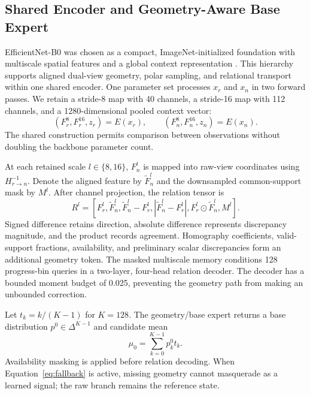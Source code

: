 \documentclass[electronics,article,submit,oneauthor]{Definitions/mdpi}
\begin{document}
\subsection{Shared Encoder and Geometry-Aware Base Expert}
\label{subsec:geometry}

EfficientNet-B0 was chosen as a compact, ImageNet-initialized foundation with multiscale spatial features and a global context representation \cite{tan2019efficientnet}. This hierarchy supports aligned dual-view geometry, polar sampling, and relational transport within one shared encoder. One parameter set processes $x_r$ and $x_n$ in two forward passes. We retain a stride-8 map with 40 channels, a stride-16 map with 112 channels, and a 1280-dimensional pooled context vector:
\begin{equation}
(F_r^8,F_r^{16},z_r)=E(x_r),\qquad (F_n^8,F_n^{16},z_n)=E(x_n).
\label{eq:encoder}
\end{equation}
The shared construction permits comparison between observations without doubling the backbone parameter count.

At each retained scale $l\in\{8,16\}$, $F_n^l$ is mapped into raw-view coordinates using $H_{r\rightarrow n}^{-1}$. Denote the aligned feature by $\widetilde{F}_n^l$ and the downsampled common-support mask by $M^l$. After channel projection, the relation tensor is
\begin{equation}
R^l=\left[F_r^l,\widetilde{F}_n^l,\widetilde{F}_n^l-F_r^l,
|\widetilde{F}_n^l-F_r^l|,F_r^l\odot\widetilde{F}_n^l,M^l\right].
\label{eq:relation}
\end{equation}
Signed difference retains direction, absolute difference represents discrepancy magnitude, and the product records agreement. Homography coefficients, valid-support fractions, availability, and preliminary scalar discrepancies form an additional geometry token. The masked multiscale memory conditions 128 progress-bin queries in a two-layer, four-head relation decoder. The decoder has a bounded moment budget of 0.025, preventing the geometry path from making an unbounded correction.

Let $t_k=k/(K-1)$ for $K=128$. The geometry/base expert returns a base distribution $p^0\in\Delta^{K-1}$ and candidate mean
\begin{equation}
\mu_0=\sum_{k=0}^{K-1}p_k^0t_k.
\label{eq:base_mean}
\end{equation}
Availability masking is applied before relation decoding. When Equation~\eqref{eq:fallback} is active, missing geometry cannot masquerade as a learned signal; the raw branch remains the reference state.
\end{document}
